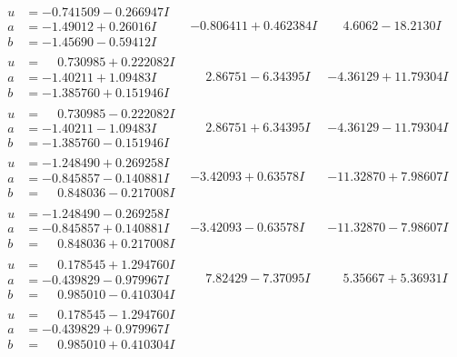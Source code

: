 \documentclass[1p]{elsarticle_modified}
\theoremstyle{definition}
\begin{document}
$$\begin{array}{c|c|c}
\begin{aligned}
u &= -0.741509 - 0.266947 I \\
a &= -1.49012 + 0.26016 I \\
b &= -1.45690 - 0.59412 I\end{aligned}
 & -0.806411 + 0.462384 I & \phantom{-}4.6062 - 18.2130 I \\ \hline\begin{aligned}
u &= \phantom{-}0.730985 + 0.222082 I \\
a &= -1.40211 + 1.09483 I \\
b &= -1.385760 + 0.151946 I\end{aligned}
 & \phantom{-}2.86751 - 6.34395 I & -4.36129 + 11.79304 I \\ \hline\begin{aligned}
u &= \phantom{-}0.730985 - 0.222082 I \\
a &= -1.40211 - 1.09483 I \\
b &= -1.385760 - 0.151946 I\end{aligned}
 & \phantom{-}2.86751 + 6.34395 I & -4.36129 - 11.79304 I \\ \hline\begin{aligned}
u &= -1.248490 + 0.269258 I \\
a &= -0.845857 - 0.140881 I \\
b &= \phantom{-}0.848036 - 0.217008 I\end{aligned}
 & -3.42093 + 0.63578 I & -11.32870 + 7.98607 I \\ \hline\begin{aligned}
u &= -1.248490 - 0.269258 I \\
a &= -0.845857 + 0.140881 I \\
b &= \phantom{-}0.848036 + 0.217008 I\end{aligned}
 & -3.42093 - 0.63578 I & -11.32870 - 7.98607 I \\ \hline\begin{aligned}
u &= \phantom{-}0.178545 + 1.294760 I \\
a &= -0.439829 - 0.979967 I \\
b &= \phantom{-}0.985010 - 0.410304 I\end{aligned}
 & \phantom{-}7.82429 - 7.37095 I & \phantom{-}5.35667 + 5.36931 I \\ \hline\begin{aligned}
u &= \phantom{-}0.178545 - 1.294760 I \\
a &= -0.439829 + 0.979967 I \\
b &= \phantom{-}0.985010 + 0.410304 I\end{aligned}

\end{array}$$
\end{document}
